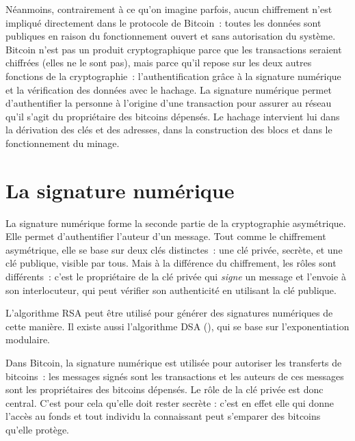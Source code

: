Néanmoins, contrairement à ce qu'on imagine parfois, aucun chiffrement n'est impliqué directement dans le protocole de Bitcoin~: toutes les données sont publiques en raison du fonctionnement ouvert et sans autorisation du système. Bitcoin n'est pas un produit cryptographique parce que les transactions seraient chiffrées (elles ne le sont pas), mais parce qu'il repose sur les deux autres fonctions de la cryptographie~: l'authentification grâce à la signature numérique et la vérification des données avec le hachage. La signature numérique permet d'authentifier la personne à l'origine d'une transaction pour assurer au réseau qu'il s'agit du propriétaire des bitcoins dépensés. Le hachage intervient lui dans la dérivation des clés et des adresses, dans la construction des blocs et dans le fonctionnement du minage.

\section*{La signature numérique}

La signature numérique forme la seconde partie de la cryptographie asymétrique. Elle permet d'authentifier l'auteur d'un message. Tout comme le chiffrement asymétrique, elle se base sur deux clés distinctes~: une clé privée, secrète, et une clé publique, visible par tous. Mais à la différence du chiffrement, les rôles sont différents~: c'est le propriétaire de la clé privée qui \emph{signe} un message et l'envoie à son interlocuteur, qui peut vérifier son authenticité en utilisant la clé publique. 

L'algorithme RSA peut être utilisé pour générer des signatures numériques de cette manière. Il existe aussi l'algorithme DSA (), qui se base sur l'exponentiation modulaire.

Dans Bitcoin, la signature numérique est utilisée pour autoriser les transferts de bitcoins~: les messages signés sont les transactions et les auteurs de ces messages sont les propriétaires des bitcoins dépensés. Le rôle de la clé privée est donc central. C'est pour cela qu'elle doit rester secrète : c'est en effet elle qui donne l'accès au fonds et tout individu la connaissant peut s'emparer des bitcoins qu'elle protège.


